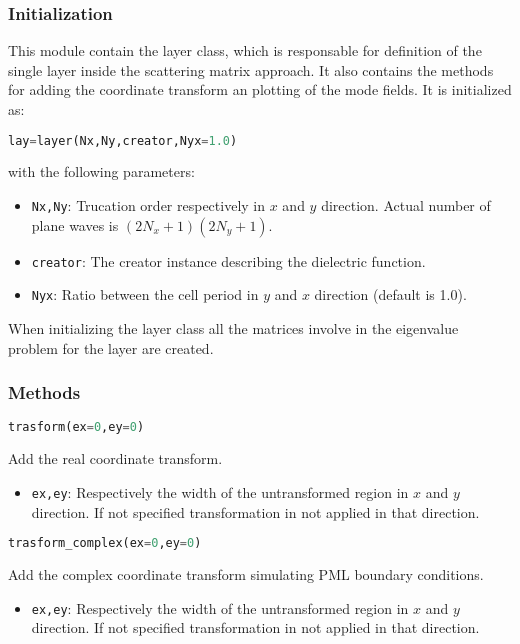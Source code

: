 \documentclass[a4paper,10pt]{report}
\begin{document}
\subsubsection{Initialization}
This module contain the layer class, which is responsable for definition of the single layer inside the scattering matrix approach. It also contains the methods for adding the coordinate transform an plotting of the mode fields. It is initialized as: 
\begin{lstlisting}[language=Python]
lay=layer(Nx,Ny,creator,Nyx=1.0)
\end{lstlisting}
with the following parameters:
\begin{itemize}[noitemsep,topsep=0pt,parsep=0pt,partopsep=0pt]
\item \texttt{Nx,Ny}: Trucation order respectively in $x$ and $y$ direction. Actual number of plane waves is $(2N_x+1)(2N_y+1)$.
\item \texttt{creator}: The creator instance describing the dielectric function.
\item \texttt{Nyx}: Ratio between the cell period in $y$ and $x$ direction (default is 1.0).
\end{itemize}
When initializing the layer class all the matrices involve in the eigenvalue problem for the layer are created.
\subsubsection{Methods}
\begin{lstlisting}[language=Python,basicstyle=\ttfamily\Large]
trasform(ex=0,ey=0)
\end{lstlisting}
Add the real coordinate transform.
\begin{itemize}[noitemsep,topsep=0pt,parsep=0pt,partopsep=0pt]
\item \texttt{ex,ey}: Respectively the width of the untransformed region in $x$ and $y$ direction. If not specified transformation in not applied in that direction.
\end{itemize}

\begin{lstlisting}[language=Python,basicstyle=\ttfamily\Large]
trasform_complex(ex=0,ey=0)
\end{lstlisting}
Add the complex coordinate transform simulating PML boundary conditions. 
\begin{itemize}[noitemsep,topsep=0pt,parsep=0pt,partopsep=0pt]
\item \texttt{ex,ey}: Respectively the width of the untransformed region in $x$ and $y$ direction. If not specified transformation in not applied in that direction.
\end{itemize}
\end{document}
